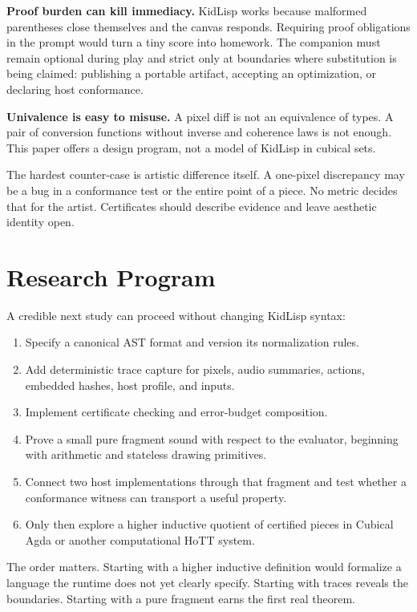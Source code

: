 \documentclass[10pt,letterpaper,twocolumn]{article}
\begin{document}
\textbf{Proof burden can kill immediacy.} KidLisp works because malformed parentheses close themselves and the canvas responds. Requiring proof obligations in the prompt would turn a tiny score into homework. The companion must remain optional during play and strict only at boundaries where substitution is being claimed: publishing a portable artifact, accepting an optimization, or declaring host conformance.

\textbf{Univalence is easy to misuse.} A pixel diff is not an equivalence of types. A pair of conversion functions without inverse and coherence laws is not enough. This paper offers a design program, not a model of KidLisp in cubical sets.

The hardest counter-case is artistic difference itself. A one-pixel discrepancy may be a bug in a conformance test or the entire point of a piece. No metric decides that for the artist. Certificates should describe evidence and leave aesthetic identity open.

\section{Research Program}
\label{sec:future}

A credible next study can proceed without changing KidLisp syntax:

\begin{enumerate}
\item Specify a canonical AST format and version its normalization rules.
\item Add deterministic trace capture for pixels, audio summaries, actions, embedded hashes, host profile, and inputs.
\item Implement certificate checking and error-budget composition.
\item Prove a small pure fragment sound with respect to the evaluator, beginning with arithmetic and stateless drawing primitives.
\item Connect two host implementations through that fragment and test whether a conformance witness can transport a useful property.
\item Only then explore a higher inductive quotient of certified pieces in Cubical Agda or another computational HoTT system.
\end{enumerate}

The order matters. Starting with a higher inductive definition would formalize a language the runtime does not yet clearly specify. Starting with traces reveals the boundaries. Starting with a pure fragment earns the first real theorem.
\end{document}
